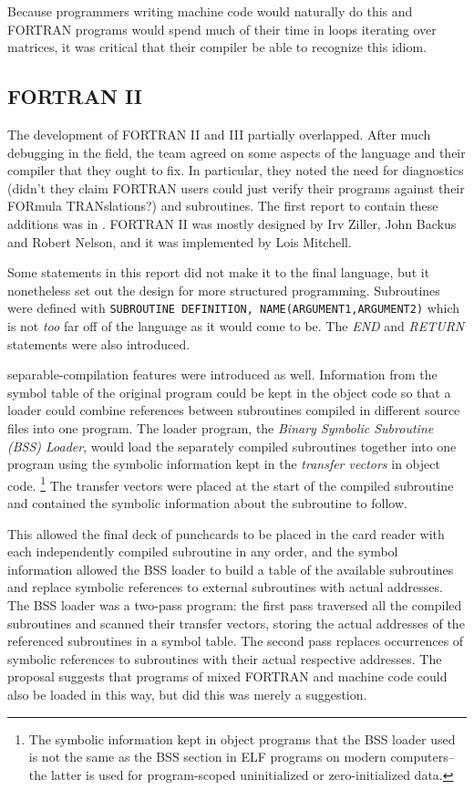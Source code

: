 Because programmers writing machine code would naturally do this and FORTRAN
programs would spend much of their time in loops iterating over matrices,
it was critical that their compiler be able to recognize this idiom.

\subsection{FORTRAN II}

The development of FORTRAN II and III partially overlapped.
After much debugging in the field, the team agreed on some aspects of the language
and their compiler that they ought to fix.
In particular, they noted the need for diagnostics (didn't they claim FORTRAN
users could just verify their programs against their FORmula TRANslations?)
and subroutines.
The first report to contain these additions was  in
\citeyear{fortran_ii_proposal_1957}.
FORTRAN II was mostly designed by Irv Ziller, John Backus and Robert Nelson,
and it was implemented by Lois Mitchell.

Some statements in this report did not make it to the final language, but it
nonetheless set out the design for more structured programming.
Subroutines were defined with \texttt{SUBROUTINE DEFINITION, NAME(ARGUMENT1,ARGUMENT2)}
which is not \textit{too} far off of the language as it would come to be.
The \textit{END} and \textit{RETURN} statements were also introduced.

\Gls{separable-compilation} features were introduced as well.
Information from the symbol table of the original program could be kept
in the object code so that a loader could combine references between subroutines
compiled in different source files into one program.
The loader program, the \textit{Binary Symbolic Subroutine (BSS) Loader},
would load the separately compiled subroutines together into one program using
the symbolic information kept in the \textit{transfer vectors} in object code.
\footnote{The symbolic information kept in object programs that the BSS loader
	used is not the same as the BSS section in ELF programs on modern computers--
	the latter is used for program-scoped uninitialized or zero-initialized data.}
The transfer vectors were placed at the start of the compiled subroutine and
contained the symbolic information about the subroutine to follow.

This allowed the final deck of punchcards to be placed in the card reader
with each independently compiled subroutine in any order, and the symbol information
allowed the BSS loader to build a table of the available subroutines and replace
symbolic references to external subroutines with actual addresses.
The BSS loader was a two-pass program: the first pass traversed all the compiled
subroutines and scanned their transfer vectors, storing the actual addresses of
the referenced subroutines in a symbol table.
The second pass replaces occurrences of symbolic references to subroutines
with their actual respective addresses.
The proposal suggests that programs of mixed FORTRAN and machine code could
also be loaded in this way, but did this was merely a suggestion.

